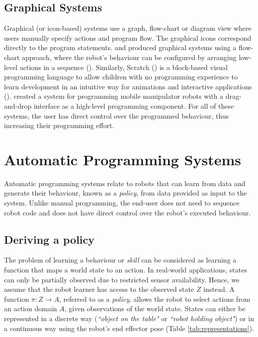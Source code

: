 \subsection{Graphical Systems}\label{sssec:Graphical systems}
Graphical (or icon-based) systems use a graph, flow-chart or diagram view where users manually specify actions and program flow.
The graphical icons correspond directly to the program statements.
\cite{lego2003} and \cite{bischoff2002morpha} produced graphical systems using a flow-chart approach, where the robot's behaviour can be configured by arranging low-level actions in a sequence ().
Similarly, Scratch (\cite{majed2014learn}) is a block-based visual programming language to allow children with no programming experience to learn development in an intuitive way for animations and interactive applications ().
\cite{huang2017code3} created a system for programming mobile manipulator robots with a drag-and-drop interface as a high-level programming component.
For all of these systems, the user has direct control over the programmed behaviour, thus increasing their programming effort.
\section{Automatic Programming Systems}\label{subsec:Automatic Programming Systems}
Automatic programming systems relate to robots that can learn from data and generate their behaviour, known as a \textit{policy}, from data provided as input to the system.
Unlike manual programming, the end-user does not need to sequence robot code and does not have direct control over the robot's executed behaviour.

\subsection{Deriving a policy}\label{subsec:Deriving a policy}
The problem of learning a behaviour or \textit{skill} can be considered as learning a function that maps a world state to an action.
In real-world applications, states can only be partially observed due to restricted sensor availability.
Hence, we assume that the robot learner has access to the observed state $Z$ instead.
A function $\pi : Z \rightarrow A$, referred to as a \textit{policy}, allows the robot to select actions from an action domain $A$, given observations of the world state.
States can either be represented in a discrete way (\textit{``object on the table"} or \textit{``robot holding object"}) or in a continuous way \eg using the robot's end effector pose (Table \ref{tab:representations}).

